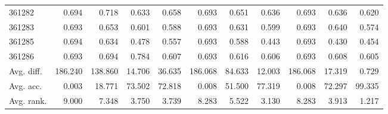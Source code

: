 \begin{tabular}{lrrrrrrrrrr}
361282 & 0.694 & 0.718 & 0.633 & 0.658 & 0.693 & 0.651 & 0.636 & 0.693 & 0.636 & 0.620 \\
361283 & 0.693 & 0.653 & 0.601 & 0.588 & 0.693 & 0.631 & 0.599 & 0.693 & 0.640 & 0.574 \\
361285 & 0.694 & 0.634 & 0.478 & 0.557 & 0.693 & 0.588 & 0.443 & 0.693 & 0.430 & 0.454 \\
361286 & 0.693 & 0.694 & 0.784 & 0.607 & 0.693 & 0.616 & 0.606 & 0.693 & 0.608 & 0.605 \\
Avg. diff. & 186.240 & 138.860 & 14.706 & 36.635 & 186.068 & 84.633 & 12.003 & 186.068 & 17.319 & 0.729 \\
Avg. acc. & 0.003 & 18.771 & 73.502 & 72.818 & 0.008 & 51.500 & 77.319 & 0.008 & 72.297 & 99.335 \\
Avg. rank. & 9.000 & 7.348 & 3.750 & 3.739 & 8.283 & 5.522 & 3.130 & 8.283 & 3.913 & 1.217 \\
\bottomrule
\end{tabular}
